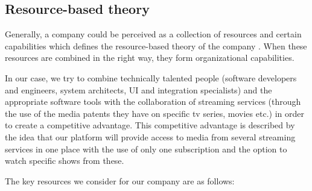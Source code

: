 \subsection{Resource-based theory}

Generally, a company could be perceived as a collection of resources and certain capabilities which defines the resource-based theory of the company \cite[p. 13-14]{fiveForces}.
When these resources are combined in the right way, they form organizational capabilities.

In our case, we try to combine technically talented people (software developers and engineers, system architects, UI and integration specialists) and the appropriate software tools with the collaboration of streaming services (through the use of the media patents they have on specific tv series, movies etc.) in order to create a competitive advantage. This competitive advantage is described by the idea that our platform will provide access to media from several streaming services in one place with the use of only one subscription and the option to watch specific shows from these.

The key resources we consider for our company are as follows:

